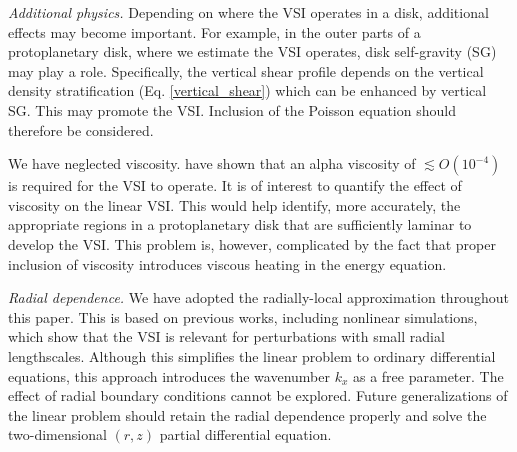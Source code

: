 \emph{Additional physics.} Depending on where the VSI operates in a
disk, additional effects may become important. For example, in the
outer parts of a protoplanetary disk, where we estimate the VSI 
operates, disk self-gravity (SG) may play a role. Specifically, the vertical
shear profile depends on the vertical density stratification
(Eq. \ref{vertical_shear}) which can be enhanced by vertical SG. This
may promote the VSI. Inclusion of the Poisson equation should
therefore be considered.  

We have neglected viscosity. \cite{nelson13} have shown that an
alpha viscosity of $\lesssim O(10^{-4})$ is required for the VSI to
operate. It is of interest to quantify the effect of viscosity
on the linear VSI. This would help identify, more accurately, the
appropriate regions in a protoplanetary disk that are sufficiently
laminar to develop the VSI.  This problem is, however, complicated by
the fact that proper inclusion of viscosity introduces viscous heating
in the energy equation. 


\emph{Radial dependence.} We have adopted the radially-local approximation 
throughout this paper. This is based on previous works, including
nonlinear simulations, which show that the VSI is relevant for
perturbations with small radial lengthscales. Although this simplifies
the linear problem to ordinary differential equations, this approach
introduces the wavenumber $k_x$ as a free parameter. The effect
of radial boundary conditions cannot be explored. Future
generalizations of the linear problem should retain the radial
dependence properly and solve the two-dimensional $(r,z)$ partial 
differential equation.     





